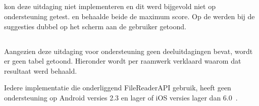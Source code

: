 \subsection{}
\label{sec:evaluatie-ondersteuning-autoaanvullen}

\st{} kon deze uitdaging niet implementeren en dit werd bijgevold niet op ondersteuning getest.
\kendo{} en \jqm{} behaalde beide de maximum score.
Op de \htc{} werden bij \lungo{} de suggesties dubbel op het scherm aan de gebruiker getoond.

% 
% 
% 

\subsection{}
\label{sec:evaluatie-ondersteuning-afbeelding}

Aangezien deze uitdaging voor ondersteuning geen deeluitdagingen bevat, wordt er geen tabel getoond.
Hieronder wordt per raamwerk verklaard waarom dat resultaat werd behaald.

Iedere implementatie die onderliggend FileReaderAPI gebruik, heeft geen ondersteuning op Android versies 2.3 en lager of iOS versies lager dan 6.0~\cite{Deveria2013c}.

